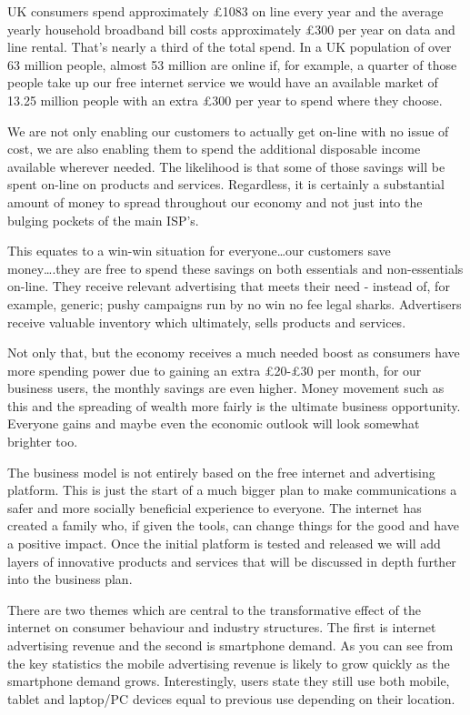 \documentclass[letterpaper,10pt,openany,oneside,english]{sphinxmanual}
\begin{document}
UK consumers spend approximately £1083 on line every year and the average yearly household broadband bill costs approximately £300 per year on data and line rental. That’s nearly a third of the total spend. In a UK population of over 63 million people, almost 53 million are online if, for example, a quarter of those people take up our free internet service we would have an available market of 13.25 million people with an extra £300 per year to spend where they choose.

We are not only enabling our customers to actually get on-line with no issue of cost, we are also enabling them to spend the additional disposable income available wherever needed. The likelihood is that some of those savings will be spent on-line on products and services. Regardless, it is certainly a substantial amount of money to spread throughout our economy and not just into the bulging pockets of the main ISP’s.

This equates to a win-win situation for everyone…our customers save money….they are free to spend these savings on both essentials and non-essentials on-line. They receive relevant advertising that meets their need - instead of, for example, generic; pushy campaigns run by no win no fee legal sharks. Advertisers receive valuable inventory which ultimately, sells products and services.

Not only that, but the economy receives a much needed boost as consumers have more spending power due to gaining an extra £20-£30 per month, for our business users, the monthly savings are even higher. Money movement such as this and the spreading of wealth more fairly is the ultimate business opportunity. Everyone gains and maybe even the economic outlook will look somewhat brighter too.

The business model is not entirely based on the free internet and advertising platform. This is just the start of a much bigger plan to make communications a safer and more socially beneficial experience to everyone. The internet has created a family who, if given the tools, can change things for the good and have a positive impact. Once the initial platform is tested and released we will add layers of innovative products and services that will be discussed in depth further into the business plan.

There are two themes which are central to the transformative effect of the internet on consumer behaviour and industry structures. The first is internet advertising revenue and the second is smartphone demand. As you can see from the key statistics the mobile advertising revenue is likely to grow quickly as the smartphone demand grows. Interestingly, users state they still use both mobile, tablet and laptop/PC devices equal to previous use depending on their location.
\end{document}
